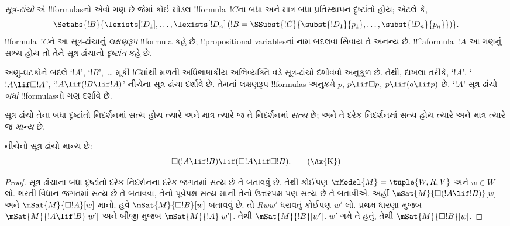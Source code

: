 \documentclass[../../../include/open-logic-section]{subfiles}
\begin{document}


\begin{defn}
  \emph{સૂત્ર-ઢાંચો} એ !!{formula}sનો એવો ગણ છે જેમાં
  કોઈ મોડલ !!{formula}~$!C$ના બધા અને માત્ર બધા
  પ્રતિસ્થાપન દૃષ્ટાંતો હોય; એટલે કે,
  \[
  \Setabs{!B}{\lexists[!D_1], \dots, \lexists[!D_n] \left(!B =
  \SSubst{!C}{\subst{!D_1}{p_1}, \dots, \subst{!D_n}{p_n}} \right) }.
  \]
  !!{formula}~$!C$ને આ સૂત્ર-ઢાંચાનું \emph{લક્ષણરૂપ}
  !!{formula} કહે છે; !!{propositional
  variable}sનાં નામ બદલવા સિવાય તે અનન્ય છે.
  !!^a{formula}~$!A$ આ ગણનું સભ્ય હોય તો તેને
  સૂત્ર-ઢાંચાનો \emph{દૃષ્ટાંત} કહે છે.
\end{defn}

અણુ-ઘટકોને બદલે `$!A$', `$!B$',~\dots{} મૂકી
$!C$માંથી મળતી અધિભાષાકીય અભિવ્યક્તિ વડે
સૂત્ર-ઢાંચો દર્શાવવો અનુકૂળ છે. તેથી, દાખલા તરીકે,
`$!A$', `$!A \lif \Box!A$', `$!A \lif (!B \lif !A)$'
નીચેના સૂત્ર-ઢાંચા દર્શાવે છે. તેમનાં લક્ષણરૂપ
!!{formula}s અનુક્રમે $p$, $p \lif \Box p$, $p \lif (q
\lif p)$ છે. `$!A$' સૂત્ર-ઢાંચો \emph{બધાં}
!!{formula}sનો ગણ દર્શાવે છે.

\begin{defn}
  સૂત્ર-ઢાંચો તેના બધા દૃષ્ટાંતો નિદર્શનમાં સત્ય હોય
  ત્યારે અને માત્ર ત્યારે જ તે નિદર્શનમાં \emph{સત્ય} છે;
  અને તે દરેક નિદર્શનમાં સત્ય હોય ત્યારે અને માત્ર
  ત્યારે જ \emph{માન્ય} છે.
\end{defn}

\begin{prop}
  નીચેનો સૂત્ર-ઢાંચો  માન્ય છે:
  \begin{equation*}
  \Box(!A \lif !B) \lif (\Box !A \lif \Box !B). \tag{\Ax{K}}
  \end{equation*}
\end{prop}

\begin{proof}
  સૂત્ર-ઢાંચાના બધા દૃષ્ટાંતો દરેક નિદર્શનના દરેક
  જગતમાં સત્ય છે તે બતાવવું છે. તેથી કોઈપણ
  $\mModel{M} = \tuple{W,R,V}$ અને $w \in
  W$ લો. શરતી વિધાન જગતમાં સત્ય છે તે બતાવવા,
  તેનો પૂર્વપક્ષ સત્ય માની તેનો ઉત્તરપક્ષ પણ સત્ય
  છે તે બતાવીએ. અહીં $\mSat{M}{\Box(!A \lif !B)}[w]$
  અને $\mSat{M}{\Box !A}[w]$ માનો. હવે
  $\mSat{M}{\Box !B}[w]$ બતાવવું છે. તો $Rww'$
  ધરાવતું કોઈપણ $w'$ લો. પ્રથમ ધારણા મુજબ
  $\mSat{M}{!A \lif !B}[w']$ અને બીજી મુજબ
  $\mSat{M}{!A}[w']$. તેથી $\mSat{M}{!B}[w']$.
  $w'$ ગમે તે હતું, તેથી $\mSat{M}{\Box !B}[w]$.
\end{proof}
\end{document}
